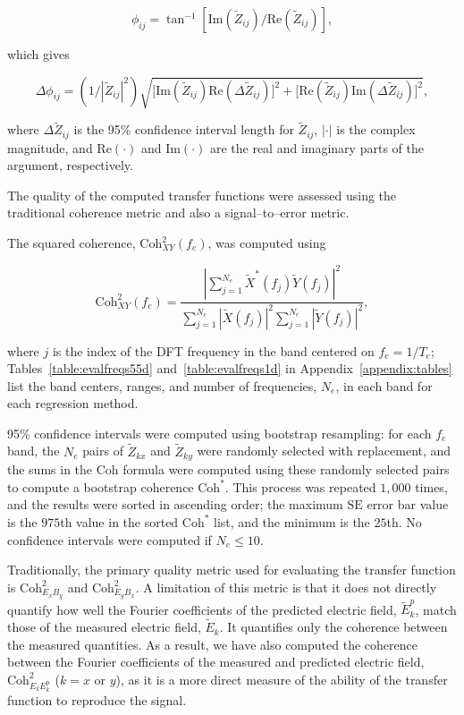 \documentclass[pdflatex,sn-basic]{sn-jnl}%
\begin{document}
$$\phi_{ij} = \tan^{-1}[
  \text{Im}(\widetilde{Z}_{ij})
  /
  \text{Re}(\widetilde{Z}_{ij})],
$$

\noindent which gives

$$
  \Delta\phi_{ij} = (1/|\widetilde{Z}_{ij}|^2)
  \sqrt{
    \big[
      \text{Im}(\widetilde{Z}_{ij})\text{Re}(\Delta \widetilde{Z}_{ij})
    \big]^2
    +
    \big[
      \text{Re}(\widetilde{Z}_{ij})\text{Im}(\Delta \widetilde{Z}_{ij})
    \big]^2
  },
$$

\noindent
where $\Delta \widetilde{Z}_{ij}$ is the 95\% confidence interval length for $\widetilde{Z}_{ij}$, $|\boldsymbol{\cdotp}|$ is the complex magnitude, and $\text{Re}(\boldsymbol{\cdotp})$ and $\text{Im}(\boldsymbol{\cdotp})$ are the real and imaginary parts of the argument, respectively.

The quality of the computed transfer functions were assessed using the traditional coherence metric and also a signal--to--error metric.

The squared coherence, $\text{Coh}^2_{XY}(f_e)$, was computed using

\begin{equation}
  \text{Coh}^2_{XY}(f_e) = \frac{\left|\displaystyle\sum_{j=1}^{N_e}\widetilde{X}^*(f_j)\widetilde{Y}(f_j)\right|^2}{\displaystyle\sum_{j=1}^{N_e} \left|\widetilde{X}(f_j)\right|^2\sum_{j=1}^{N_e} \left|\widetilde{Y}(f_j)\right|^2},
\end{equation}

\noindent
where $j$ is the index of the DFT frequency in the band centered on $f_e=1/T_e$; Tables~\ref{table:evalfreqs55d} and~\ref{table:evalfreqs1d} in Appendix~\ref{appendix:tables} list the band centers, ranges, and number of frequencies, $N_e$, in each band for each regression method.

95\% confidence intervals were computed using bootstrap resampling: for each $f_e$ band, the $N_e$ pairs of $\widetilde{Z}_{kx}$ and $\widetilde{Z}_{ky}$ were randomly selected with replacement, and the sums in the $\text{Coh}$ formula were computed using these randomly selected pairs to compute a bootstrap coherence $\text{Coh}^*$. This process was repeated $1,000$ times, and the results were sorted in ascending order; the maximum $\text{SE}$ error bar value is the $975$th value in the sorted $\text{Coh}^*$ list, and the minimum is the $25$th. No confidence intervals were computed if $N_e\le 10$.

Traditionally, the primary quality metric used for evaluating the transfer function is $\text{Coh}^2_{E_xB_y}$ and $\text{Coh}^2_{E_yB_x}$. A limitation of this metric is that it does not directly quantify how well the Fourier coefficients of the predicted electric field, $\widetilde{E}^p_k$, match those of the measured electric field, $\widetilde{E}_k$. It quantifies only the coherence between the measured quantities. As a result, we have also computed the coherence between the Fourier coefficients of the measured and predicted electric field, $\text{Coh}^2_{E_kE^\text{p}_k}$ ($k=x\mbox{ or }y$), as it is a more direct measure of the ability of the transfer function to reproduce the signal.
\end{document}
